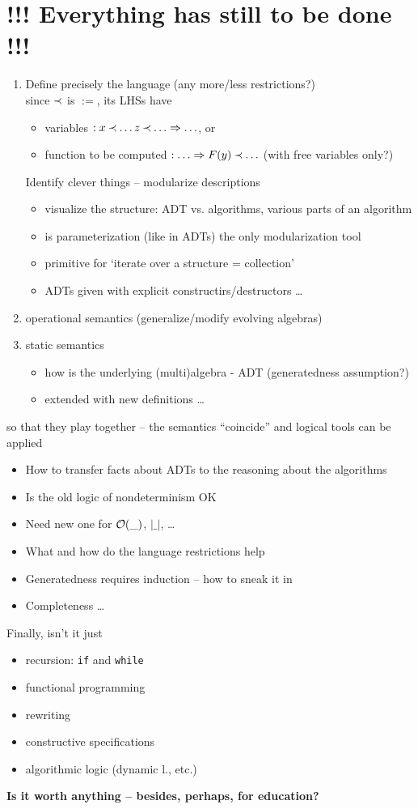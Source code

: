 \documentclass[leqno]{article}
\newcommand{\itemo}{\item[{\bf ?}]}
\newcommand{\sz}[1]{|#1|} %
\begin{document}
\section*{!!! Everything has still to be done !!!}
{\large{
\begin{enumerate}
\item Define precisely the language (any more/less restrictions?) \\[1ex]
  since $\mathbin{\prec}$ is $:=$, its LHSs have 
 \begin{itemize}
  \item variables $:x\mathbin{\prec}\ldots z\mathbin{\prec}\ldots\mathrel\Rightarrow\ldots$, or
  \item function to be computed $:\ldots \mathrel\Rightarrow F(y)\mathbin{\prec}\ldots$ 
 (with free variables only?)
 \end{itemize}
 Identify clever things -- modularize descriptions
 \begin{itemize}
  \itemo visualize the structure: ADT vs. algorithms, various parts of an algorithm
  \itemo is parameterization (like in ADTs) the only modularization tool 
  \itemo primitive for `iterate over a structure = collection' 
  \itemo ADTs given with explicit constructirs/destructors \ldots
 \end{itemize}
\item operational semantics (generalize/modify evolving algebras)
\item static semantics
 \begin{itemize}
  \itemo how is the underlying (multi)algebra - ADT (generatedness assumption?)
  \itemo extended with new definitions \ldots \\
 \end{itemize} 
\end{enumerate}
so that they play together -- the semantics ``coincide'' and logical tools can be applied
\begin{itemize}
\itemo How to transfer facts about ADTs to the reasoning about the algorithms
\itemo Is the old logic of nondeterminism OK
\itemo Need new one for ${\cal O}(\_)$, $\sz{\_}$, \ldots
\itemo What and how do the language restrictions help 
\itemo Generatedness requires induction -- how to sneak it in
\itemo Completeness  \ldots \\
  \end{itemize}
%
Finally, isn't it just 
 \begin{itemize}\MyLPar
 \itemo recursion: {\tt if} and {\tt while}
 \itemo functional programming
 \itemo rewriting
 \itemo constructive specifications 
 \itemo algorithmic logic (dynamic l., etc.) \\
 \end{itemize}
\hfill{\bf Is it worth anything -- besides, perhaps, for education?}
}}
\end{document}
